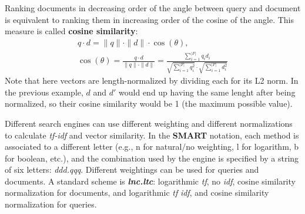 Ranking documents in decreasing order of the angle between query and document is equivalent to ranking them in increasing order of the cosine of the angle. This measure is called \textbf{cosine similarity}:
\begin{gather*}
    q \cdot d = \|q\| \cdot \|d\| \cdot \cos(\theta), \\
    \cos(\theta) = \frac{q \cdot d}{\|q\| \cdot \|d\|} = \frac{\sum_{i=1}^{|F|} q_i d_i}{\sqrt{\sum_{i=1}^{|F|} q_i^2} \cdot \sqrt{\sum_{i=1}^{|F|} d_i^2}}
\end{gather*}
Note that here vectors are length-normalized by dividing each for its L2 norm. In the previous example, $d$ and $d'$ would end up having the same lenght after being normalized, so their cosine similarity would be 1 (the maximum possible value).

Different search engines can use different weighting and different normalizations to calculate \textit{tf-idf} and vector similarity. In the \textbf{SMART} notation, each method is associated to a different letter (e.g., n for natural/no weighting, l for logarithm, b for boolean, etc.), and the combination used by the engine is specified by a string of six letters: \textit{ddd.qqq}. Different weightings can be used for queries and documents. A standard scheme is \textbf{\textit{lnc.ltc}}: logarithmic \textit{tf}, no \textit{idf}, cosine similarity normalization for documents, and logarithmic \textit{tf} \textit{idf}, and cosine similarity normalization for queries.